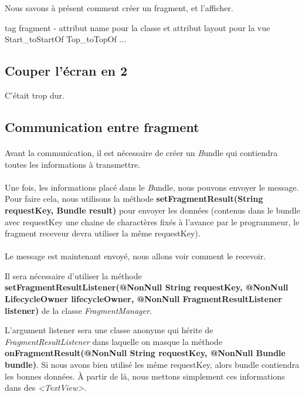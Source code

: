 \documentclass[a4paper]{article}
\begin{document}
\begin{multicols}{2}
                    Nous savons à présent comment créer un fragment, et l'afficher.
                    
                    tag fragment - attribut name pour la classe et attribut layout pour la vue
                    \\
                    Start\_toStartOf
                    Top\_toTopOf 
                    ...
            
            \subsection{Couper l'écran en 2}
                C'était trop dur.
            \subsection{Communication entre fragment}
                \paragraph{}
                    Avant la communication, il est nécessaire de créer un \emph Bundle qui contiendra toutes les informations à transmettre.
                \paragraph{}
                    Une fois, les informations placé dans le \emph Bundle, nous pouvons envoyer le message. Pour faire cela, nous utilisons la méthode \textbf{setFragmentResult(String requestKey, Bundle result)} pour envoyer les données (contenus dans le bundle avec requestKey une chaine de charactères fixés à l'avance par le programmeur, le fragment receveur devra utiliser la même requestKey).
                
                \paragraph{}
                    Le message est maintenant envoyé, nous allons voir comment le recevoir.

                    Il sera nécessaire d'utiliser la méthode \textbf{setFragmentResultListener(@NonNull String requestKey, @NonNull LifecycleOwner lifecycleOwner, @NonNull FragmentResultListener listener)} de la classe \emph{FragmentManager}.

                    L'argument listener sera une classe anonyme qui hérite de \emph{FragmentResultListener} dans laquelle on masque la méthode \textbf{onFragmentResult(@NonNull String requestKey, @NonNull Bundle bundle)}. Si nous avons bien utilisé les même requestKey, alors bundle contiendra les bonnes données. À partir de là, nous mettons simplement ces informations dans des \emph{<TextView>}. 


\end{multicols}
\end{document}
